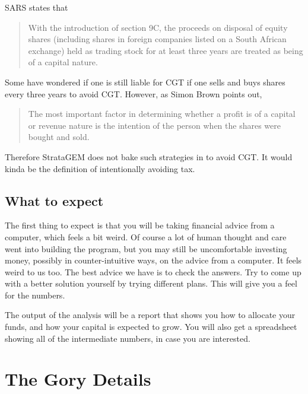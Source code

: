 \documentclass[a4paper, justified]{tufte-handout}
\begin{document}
SARS states that 
\begin{quote}
With  the  introduction  of  section 9C, the proceeds  on  disposal  of equity shares (including shares in foreign 
companies listed on a South African exchange) held as trading stock for at least three years are treated as being of a capital nature.
\end{quote}
Some have wondered if one is still liable for CGT if one sells and buys shares every three years to avoid CGT. However, as Simon Brown points out,
\begin{quote}
The most important factor in determining whether a profit is of a capital or revenue nature is 
the intention of the person when the shares were bought and sold. 
\end{quote} Therefore StrataGEM does not bake such strategies in to avoid CGT. It would kinda be the definition of intentionally avoiding tax.

\subsection{What to expect}
The first thing to expect is that you will be taking financial advice from a computer, which feels a bit weird. Of course a lot of human thought and care went into building the program, but you may still be uncomfortable investing money, possibly in counter-intuitive ways, on the advice from a computer. It feels weird to us too. The best advice we have is to check the answers. Try to come up with a better solution yourself by trying different plans. This will give you a feel for the numbers.

The output of the analysis will be a report that shows you how to allocate your funds, and how your capital is expected to grow. You will also get a spreadsheet showing all of the intermediate numbers, in case you are interested.

\newpage
\section{The Gory Details}
\end{document}
